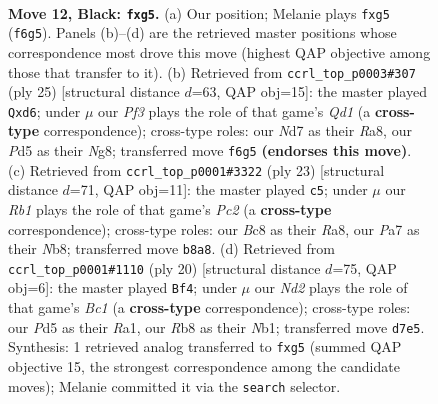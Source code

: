 \documentclass[11pt]{article}
\begin{document}
\clearpage

\begin{figure}[p]\centering
\begin{subfigure}{0.46\textwidth}\centering
\resizebox{\linewidth}{!}{%
\newchessgame
\chessboard[
  setfen={1rbqk2r/pp1n2pp/2p2p2/3p2N1/3P4/2N1P3/PP2BPPP/R2QK2R b KQk - 0 12},
  showmover=false,
  pgfstyle=straightmove, color=movearrow, markmove={f6-g5}
]}
\caption{}
\end{subfigure}\hfill
\begin{subfigure}{0.46\textwidth}\centering
\resizebox{\linewidth}{!}{%
\newchessgame
\chessboard[
  setfen={r2qk1nr/p4bpp/2pBpp2/3p3P/3P2P1/2N5/PPP2P2/R2QKB1R b KQkq - 0 13},
  showmover=false,
  pgfstyle=straightmove, color=movearrow, markmove={d8-d6}
]}
\caption{}
\end{subfigure}
\\[4pt]
\begin{subfigure}{0.46\textwidth}\centering
\resizebox{\linewidth}{!}{%
\newchessgame
\chessboard[
  setfen={rn1r2k1/p1p1qppp/1p2b3/3p4/3P4/2N1P3/PP2BPPP/2RQK2R b K - 5 12},
  showmover=false,
  pgfstyle=straightmove, color=movearrow, markmove={c7-c5}
]}
\caption{}
\end{subfigure}\hfill
\begin{subfigure}{0.46\textwidth}\centering
\resizebox{\linewidth}{!}{%
\newchessgame
\chessboard[
  setfen={r2qk1nr/pp3ppp/2nbp3/3p4/3P4/2PN4/PP3PPP/RNBQK2R w KQkq - 1 11},
  showmover=false,
  pgfstyle=straightmove, color=movearrow, markmove={c1-f4}
]}
\caption{}
\end{subfigure}
\caption{\textbf{Move 12, Black: \texttt{fxg5}.} (a) Our position; Melanie plays \texttt{fxg5} (\texttt{f6g5}). Panels (b)--(d) are the retrieved master positions whose correspondence most drove this move (highest QAP objective among those that transfer to it). (b) Retrieved from \texttt{ccrl\_top\_p0003\#307} (ply 25) [structural distance $d$=63, QAP obj=15]: the master played \texttt{Qxd6}; under $\mu$ our \emph{Pf3} plays the role of that game's \emph{Qd1} (a \textbf{cross-type} correspondence); cross-type roles: our \emph{N}d7 as their \emph{R}a8, our \emph{P}d5 as their \emph{N}g8; transferred move \texttt{f6g5} \textbf{(endorses this move)}. (c) Retrieved from \texttt{ccrl\_top\_p0001\#3322} (ply 23) [structural distance $d$=71, QAP obj=11]: the master played \texttt{c5}; under $\mu$ our \emph{Rb1} plays the role of that game's \emph{Pc2} (a \textbf{cross-type} correspondence); cross-type roles: our \emph{B}c8 as their \emph{R}a8, our \emph{P}a7 as their \emph{N}b8; transferred move \texttt{b8a8}. (d) Retrieved from \texttt{ccrl\_top\_p0001\#1110} (ply 20) [structural distance $d$=75, QAP obj=6]: the master played \texttt{Bf4}; under $\mu$ our \emph{Nd2} plays the role of that game's \emph{Bc1} (a \textbf{cross-type} correspondence); cross-type roles: our \emph{P}d5 as their \emph{R}a1, our \emph{R}b8 as their \emph{N}b1; transferred move \texttt{d7e5}. Synthesis: 1 retrieved analog transferred to \texttt{fxg5} (summed QAP objective 15, the strongest correspondence among the candidate moves); Melanie committed it via the \texttt{search} selector.}
\label{fig:thought-m23}
\end{figure}
\end{document}
